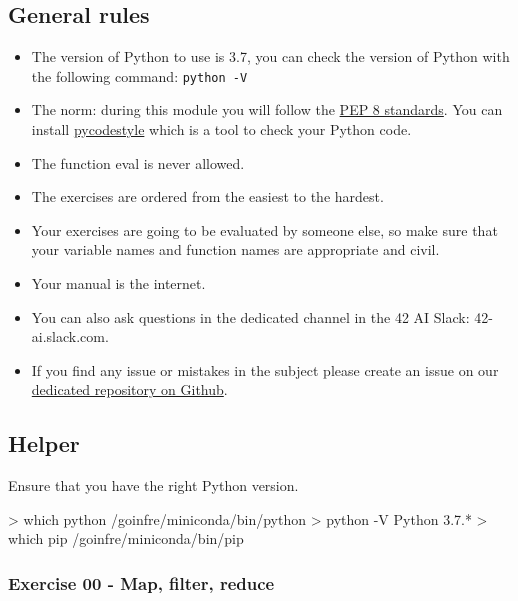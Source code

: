 \documentclass[]{article}
\newenvironment{Shaded}{\begin{snugshade}}{\end{snugshade}}
\newcommand{\NormalTok}[1]{\textcolor[rgb]{0.81,0.81,0.76}{#1}}
\begin{document}
\hypertarget{general-rules}{%
\subsection{General rules}\label{general-rules}}

\begin{itemize}
\item
  The version of Python to use is 3.7, you can check the version of
  Python with the following command: \texttt{python\ -V}
\item
  The norm: during this module you will follow the
  \href{https://www.python.org/dev/peps/pep-0008/}{PEP 8 standards}. You
  can install \href{https://pypi.org/project/pycodestyle}{pycodestyle}
  which is a tool to check your Python code.
\item
  The function eval is never allowed.
\item
  The exercises are ordered from the easiest to the hardest.
\item
  Your exercises are going to be evaluated by someone else, so make sure
  that your variable names and function names are appropriate and civil.
\item
  Your manual is the internet.
\item
  You can also ask questions in the dedicated channel in the 42 AI
  Slack: 42-ai.slack.com.
\item
  If you find any issue or mistakes in the subject please create an
  issue on our
  \href{https://github.com/42-AI/bootcamp_python/issues}{dedicated
  repository on Github}.
\end{itemize}

\hypertarget{helper}{%
\subsection{Helper}\label{helper}}

Ensure that you have the right Python version.

\begin{Shaded}
\begin{Highlighting}[]
\NormalTok{> which python}
\NormalTok{/goinfre/miniconda/bin/python}
\NormalTok{> python -V}
\NormalTok{Python 3.7.*}
\NormalTok{> which pip}
\NormalTok{/goinfre/miniconda/bin/pip}
\end{Highlighting}
\end{Shaded}

\hypertarget{exercise-00---map-filter-reduce}{%
\subsubsection{Exercise 00 - Map, filter,
reduce}\label{exercise-00---map-filter-reduce}}
\end{document}

